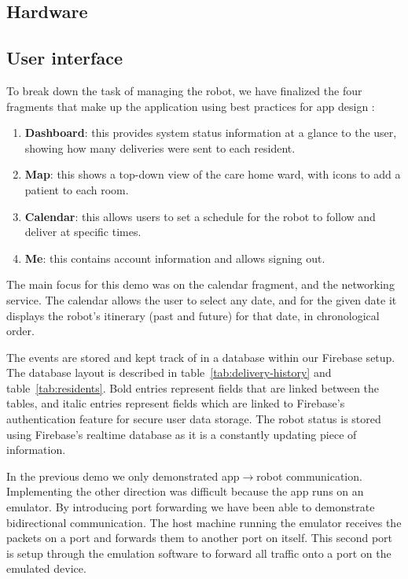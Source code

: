 \documentclass{article}
\begin{document}
\subsection{Hardware}

\subsection{User interface}
To break down the task of managing the robot, we have finalized the four fragments that make up the application using best practices for app design \cite{design, ux}:
\begin{enumerate}
  \item {\bf Dashboard}: this provides system status information at a glance to the user, showing how many deliveries were sent to each resident.
  \item {\bf Map}: this shows a top-down view of the care home ward, with icons to add a patient to each room.
  \item {\bf Calendar}: this allows users to set a schedule for the robot to follow and deliver at specific times.
  \item {\bf Me}: this contains account information and allows signing out. 
\end{enumerate}

The main focus for this demo was on the calendar fragment, and the networking service. The calendar allows the user to select any date, and for the given date it displays the robot's itinerary (past and future) for that date, in chronological order.

 The events are stored and kept track of in a database within our Firebase setup. The database layout is described in table~\ref{tab:delivery-history} and table~\ref{tab:residents}. Bold entries represent fields that are linked between the tables, and italic entries represent fields which are linked to Firebase's authentication feature for secure user data storage. The robot status is stored using Firebase's realtime database as it is a constantly updating piece of information. 

In the previous demo we only demonstrated app$\rightarrow$robot communication. Implementing the other direction was difficult because the app runs on an emulator. By introducing port forwarding we have been able to demonstrate bidirectional communication. The host machine running the emulator receives the packets on a port and forwards them to another port on itself. This second port is setup through the emulation software to forward all traffic onto a port on the emulated device.
\end{document}
